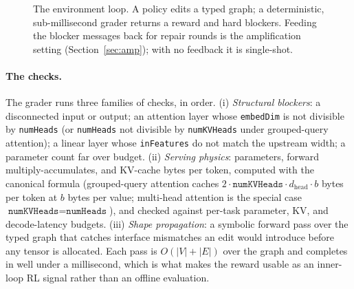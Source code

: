 \documentclass[11pt]{article}
\begin{document}
\begin{figure}[t]
\centering
{}
\caption{The environment loop. A policy edits a typed graph; a deterministic, sub-millisecond grader returns a reward and hard blockers. Feeding the blocker messages back for repair rounds is the amplification setting (Section~\ref{sec:amp}); with no feedback it is single-shot.}
\label{fig:loop}
\end{figure}

\paragraph{The checks.} The grader runs three families of checks, in order. (i) \emph{Structural blockers}: a disconnected input or output; an attention layer whose \texttt{embedDim} is not divisible by \texttt{numHeads} (or \texttt{numHeads} not divisible by \texttt{numKVHeads} under grouped-query attention); a linear layer whose \texttt{inFeatures} do not match the upstream width; a parameter count far over budget. (ii) \emph{Serving physics}: parameters, forward multiply-accumulates, and KV-cache bytes per token, computed with the canonical formula (grouped-query attention caches $2\cdot\texttt{numKVHeads}\cdot d_{\text{head}}\cdot b$ bytes per token at $b$ bytes per value; multi-head attention is the special case $\texttt{numKVHeads}=\texttt{numHeads}$), and checked against per-task parameter, KV, and decode-latency budgets. (iii) \emph{Shape propagation}: a symbolic forward pass over the typed graph that catches interface mismatches an edit would introduce before any tensor is allocated. Each pass is $O(|V|+|E|)$ over the graph and completes in well under a millisecond, which is what makes the reward usable as an inner-loop RL signal rather than an offline evaluation.
\end{document}

